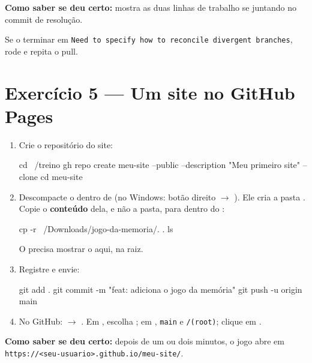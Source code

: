\textbf{Como saber se deu certo:}  mostra
as duas linhas de trabalho se juntando no commit de resolução.

\begin{aviso}
Se o  terminar em \texttt{Need to specify how to reconcile
divergent branches}, rode  e
repita o pull.
\end{aviso}

\section{Exercício 5 — Um site no GitHub Pages}

\begin{enumerate}
  \item Crie o repositório do site:
\begin{bashcode}
cd ~/treino
gh repo create meu-site --public --description "Meu primeiro site" --clone
cd meu-site
\end{bashcode}

  \item Descompacte o  dentro de 
        (no Windows: botão direito \(\rightarrow\) ). Ele
        cria a pasta . Copie o \textbf{conteúdo} dela,
        e não a pasta, para dentro do :
\begin{bashcode}
cp -r ~/Downloads/jogo-da-memoria/. .
ls
\end{bashcode}
  O  precisa mostrar o  aqui, na raiz.

  \item Registre e envie:
\begin{bashcode}
git add .
git commit -m "feat: adiciona o jogo da memória"
git push -u origin main
\end{bashcode}

  \item No GitHub:  \(\rightarrow\) . Em
        , escolha ; em
        , \texttt{main} e \texttt{/(root)}; clique em
        .
\end{enumerate}

\textbf{Como saber se deu certo:} depois de um ou dois minutos, o jogo abre
em \texttt{https://<seu-usuario>.github.io/meu-site/}.

